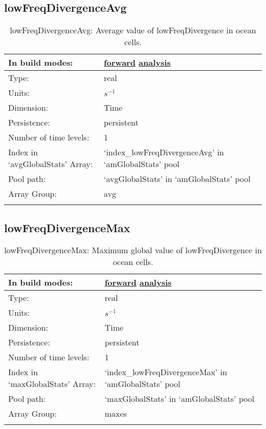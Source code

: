 \subsection[lowFreqDivergenceAvg]{lowFreqDivergenceAvg}
\label{subsec:var_sec_amGlobalStats_lowFreqDivergenceAvg}
\begin{center}
\begin{longtable}{| p{2.0in} | p{4.0in} |}
        \hline 
        In build modes: & \hyperref[subsec:forward_var_tab_amGlobalStats]{forward} \hyperref[subsec:analysis_var_tab_amGlobalStats]{analysis} \\
        \hline 
        Type: & real \\
        \hline 
        Units: & $s^{-1}$ \\
        \hline 
        Dimension: & Time \\
        \hline 
        Persistence: & persistent \\
        \hline 
        Number of time levels: & 1 \\
        \hline 
		 Index in `avgGlobalStats' Array: & `index\_lowFreqDivergenceAvg' in `amGlobalStats' pool \\
		 \hline 
            Pool path: & `avgGlobalStats' in `amGlobalStats' pool \\
		 \hline 
		 Array Group: & avg \\
		 \hline 
    \caption{lowFreqDivergenceAvg: Average value of lowFreqDivergence in ocean cells.}
\end{longtable}
\end{center}
\subsection[lowFreqDivergenceMax]{lowFreqDivergenceMax}
\label{subsec:var_sec_amGlobalStats_lowFreqDivergenceMax}
\begin{center}
\begin{longtable}{| p{2.0in} | p{4.0in} |}
        \hline 
        In build modes: & \hyperref[subsec:forward_var_tab_amGlobalStats]{forward} \hyperref[subsec:analysis_var_tab_amGlobalStats]{analysis} \\
        \hline 
        Type: & real \\
        \hline 
        Units: & $s^{-1}$ \\
        \hline 
        Dimension: & Time \\
        \hline 
        Persistence: & persistent \\
        \hline 
        Number of time levels: & 1 \\
        \hline 
		 Index in `maxGlobalStats' Array: & `index\_lowFreqDivergenceMax' in `amGlobalStats' pool \\
		 \hline 
            Pool path: & `maxGlobalStats' in `amGlobalStats' pool \\
		 \hline 
		 Array Group: & maxes \\
		 \hline 
    \caption{lowFreqDivergenceMax: Maximum global value of lowFreqDivergence in ocean cells.}
\end{longtable}
\end{center}
